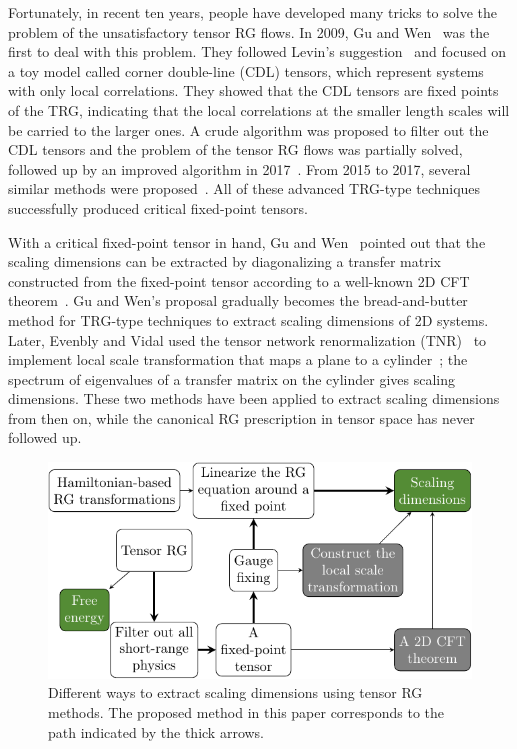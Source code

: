 \documentclass[aps,prr,reprint,superscriptaddress,nofootinbib,floatfix]{revtex4-2}
\begin{document}
Fortunately, in recent ten years, people have developed many tricks to solve the problem of the unsatisfactory tensor RG flows.
In 2009, Gu and Wen~\cite{GuWen2009} was the first to deal with this problem. 
They followed Levin's suggestion~\cite{trg,LevinTalk} and focused on a toy model called corner double-line (CDL) tensors, which represent systems with only local correlations. 
They showed that the CDL tensors are fixed points of the TRG, indicating that the local correlations at the smaller length scales will be carried to the larger ones. 
A crude algorithm was proposed to filter out the CDL tensors and the problem of the tensor RG flows was partially solved, followed up by an improved algorithm in 2017~\cite{looptnr}. 
From 2015 to 2017, several similar methods were proposed~\cite{tnr,tnralgo,tnrplus}. 
All of these advanced TRG-type techniques successfully produced critical fixed-point tensors. 
%

With a critical fixed-point tensor in hand, Gu and Wen~\cite{GuWen2009} pointed out that the scaling dimensions can be extracted by diagonalizing a transfer matrix constructed from the fixed-point tensor according to a well-known 2D CFT theorem~\cite{cardy1986}. 
Gu and Wen's proposal gradually becomes the bread-and-butter method for TRG-type techniques to extract scaling dimensions of 2D systems. 
Later, Evenbly and Vidal used the tensor network renormalization (TNR)~\cite{tnr,tnralgo} to implement local scale transformation that maps a plane to a cylinder~\cite{EvenblyDilatationOp}; the spectrum of eigenvalues of a transfer matrix on the cylinder gives scaling dimensions.
These two methods have been applied to extract scaling dimensions from then on, while the canonical RG prescription in tensor space has never followed up.
%
\begin{figure}[tb]
    \includegraphics[width=1.0\columnwidth,valign=c]{summaryintro.pdf}
    \caption{\label{fig:researchBG}
        Different ways to extract scaling dimensions using tensor RG methods.
        The proposed method in this paper corresponds to the path indicated by the thick arrows.
    }
\end{figure}
\end{document}
